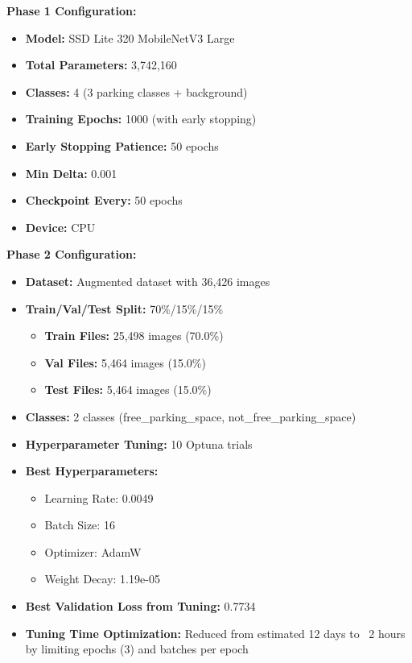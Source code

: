 \documentclass[12pt,a4paper]{article}
\begin{document}
\textbf{Phase 1 Configuration:}
\begin{itemize}
    \item \textbf{Model:} SSD Lite 320 MobileNetV3 Large
    \item \textbf{Total Parameters:} 3,742,160
    \item \textbf{Classes:} 4 (3 parking classes + background)
    \item \textbf{Training Epochs:} 1000 (with early stopping)
    \item \textbf{Early Stopping Patience:} 50 epochs
    \item \textbf{Min Delta:} 0.001
    \item \textbf{Checkpoint Every:} 50 epochs
    \item \textbf{Device:} CPU
\end{itemize}

\textbf{Phase 2 Configuration:}
\begin{itemize}
    \item \textbf{Dataset:} Augmented dataset with 36,426 images
    \item \textbf{Train/Val/Test Split:} 70\%/15\%/15\%
    \begin{itemize}
        \item \textbf{Train Files:} 25,498 images (70.0\%)
        \item \textbf{Val Files:} 5,464 images (15.0\%)
        \item \textbf{Test Files:} 5,464 images (15.0\%)
    \end{itemize}
    \item \textbf{Classes:} 2 classes (free\_parking\_space, not\_free\_parking\_space)
    \item \textbf{Hyperparameter Tuning:} 10 Optuna trials
    \item \textbf{Best Hyperparameters:}
    \begin{itemize}
        \item Learning Rate: 0.0049
        \item Batch Size: 16
        \item Optimizer: AdamW
        \item Weight Decay: 1.19e-05
    \end{itemize}
    \item \textbf{Best Validation Loss from Tuning:} 0.7734
    \item \textbf{Tuning Time Optimization:} Reduced from estimated 12 days to ~2 hours by limiting epochs (3) and batches per epoch
\end{itemize}
\end{document}

